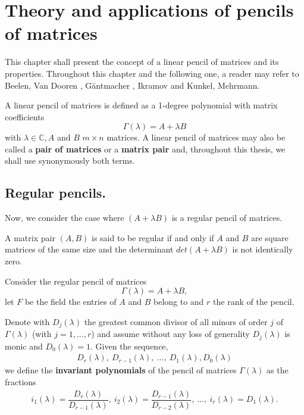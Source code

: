 \section{Theory and applications of pencils of matrices}
This chapter shall present the concept of a linear pencil of matrices and its properties. Throughout this
chapter and the following one, a reader may refer to Beelen, Van Dooren \cite{beelen-van_dooren}, G\"antmacher \cite{gantmacher},
Ikramov \cite{ikramov} and Kunkel, Mehrmann.
\cite{kunkel-mehrmann}
\begin{definition}
    A linear pencil of matrices is defined as a 1-degree polynomial with matrix coefficients
    \[
        \Gamma(\lambda) = A + \lambda B
    \]
    with \(\lambda \in \mathbb{C}, A\) and \(B\) \(m \times n\) matrices.
    A linear pencil of matrices may also be called a \textbf{pair of matrices} or a \textbf{matrix pair} and,
    throughout this thesis, we shall use synonymously both terms.
\end{definition}

\subsection*{Regular pencils.}
Now, we consider the case where \((A + \lambda B)\) is a regular pencil of matrices.
\begin{definition}\cite[p. 25, Definition 2]{gantmacher}
    A matrix pair \((A, B)\) is said to be regular if and only if \(A\) and \(B\) are square matrices of the same size and
    the determinant \(det(A + \lambda B)\) is not identically zero.
\end{definition}

Consider the regular pencil of matrices
\[\Gamma(\lambda) = A + \lambda B,\]
let \(F\) be the field the entries of \(A\) and \(B\) belong to and \(r\) the rank of the pencil.

Denote with \(D_{j}(\lambda)\) the greatest common divisor of all minors of order \(j\) of \(\Gamma(\lambda)\)
(with \(j = 1, ..., r\)) and assume without any loss of generality \(D_{j}(\lambda)\) is monic and
\(D_{0}(\lambda) = 1\). Given the sequence,
\begin{gather*}
    D_{r}(\lambda), \
    D_{r-1}(\lambda), \
    ..., \
    D_{1}(\lambda), D_{0}(\lambda)
\end{gather*}
we define the \textbf{invariant polynomials} \cite[p. 26]{gantmacher} of the pencil of matrices
\(\Gamma(\lambda)\) as the fractions
\begin{gather*}
    i_{1}(\lambda) = \dfrac{D_{r}(\lambda)}{D_{r-1}(\lambda)}, \
    i_{2}(\lambda) = \dfrac{D_{r-1}(\lambda)}{D_{r-2}(\lambda)}, \
    ..., \
    i_{r}(\lambda) = D_{1}(\lambda).
\end{gather*}


